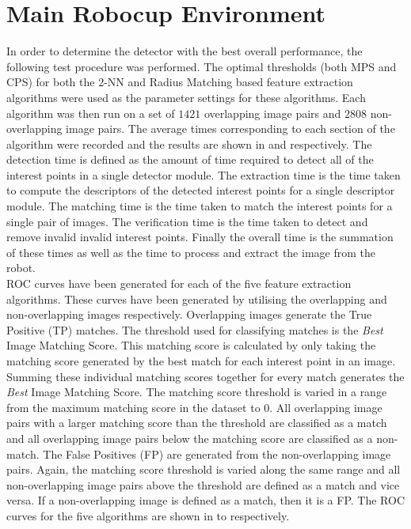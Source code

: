 \documentclass{report}
\begin{document}
\section{Main Robocup Environment}
\label{sec:mrdPerformance}
In order to determine the detector with the best overall performance, the following test procedure was performed. The optimal thresholds (both MPS and CPS) for both the 2-NN and Radius Matching based feature extraction algorithms were used as the parameter settings for these algorithms. Each algorithm was then run on a set of $1421$ overlapping image pairs and $2808$ non-overlapping image pairs. The average times corresponding to each section of the algorithm were recorded and the results are shown in  and  respectively. The detection time is defined as the amount of time required to detect all of the interest points in a single detector module. The extraction time is the time taken to compute the descriptors of the detected interest points for a single descriptor module. The matching time is the time taken to match the interest points for a single pair of images. The verification time is the time taken to detect and remove invalid invalid interest points. Finally the overall time is the summation of these times as well as the time to process and extract the image from the robot. \\

ROC curves have been generated for each of the five feature extraction algorithms. These curves have been generated by utilising the overlapping and non-overlapping images respectively. Overlapping images generate the True Positive (TP) matches. The threshold used for classifying matches is the \textit{Best} Image Matching Score. This matching score is calculated by only taking the matching score generated by the best match for each interest point in an image. Summing these individual matching scores together for every match generates the \textit{Best} Image Matching Score. The matching score threshold is varied in a range from the maximum matching score in the dataset to $0$.  All overlapping image pairs with a larger matching score than the threshold are classified as a match and all overlapping image pairs below the matching score are classified as a non-match. The False Positives (FP) are generated from the non-overlapping image pairs. Again, the matching score threshold is varied along the same range and all non-overlapping image pairs above the threshold are defined as a match and vice versa. If a non-overlapping image is defined as a match, then it is a FP. The ROC curves for the five algorithms are shown in  to  respectively.\\
\end{document}
